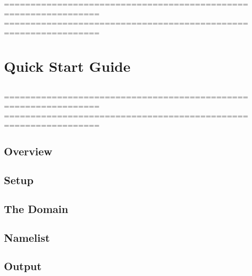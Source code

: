 %
================================================================
%
================================================================
\chapter{Quick Start Guide }
\label{qs}

$\ $\newline    %



%
\noindent ================================================================
%
================================================================

\section{Overview}

\section{Setup}
\label{dom}

\section{The Domain}
\label{dom}

\section{Namelist}
\label{nam}

\section{Output}
\label{nam}


